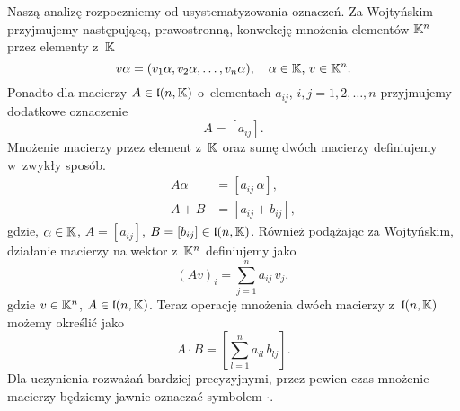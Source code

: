 \documentclass[a4paper,11pt]{article}
\begin{document}
Naszą analizę rozpoczniemy od usystematyzowania oznaczeń. Za Wojtyńskim
przyjmujemy następującą, prawostronną, konwekcję mnożenia elementów
$\mathbb{K}^{ n }$ przez elementy z~$\mathbb{K}$
\begin{equation}
  \label{eq:Wojtynski-36}
  v \alpha = ( v_{ 1 } \alpha, v_{ 2 } \alpha, \ldots, v_{ n } \alpha ), \quad
  \alpha \in \mathbb{K}, \, v \in \mathbb{K}^{ n }.
\end{equation}
Ponadto dla macierzy $A \in \mathfrak{l}( n, \mathbb{K} )$ o~elementach $a_{ ij }$,
$i, j = 1, 2, \ldots, n$ przyjmujemy dodatkowe oznaczenie
\begin{equation}
  \label{eq:Wojtynski-37}
  A = [ a_{ i j } ].
\end{equation}
Mnożenie macierzy przez element z~$\mathbb{K}$ oraz sumę dwóch macierzy
definiujemy w~zwykły sposób.
\begin{subequations}
  \begin{align}
    \label{eq:Wojtynski-38-A}
    A \alpha &= [ a_{ i j } \, \alpha ], \\
    \label{eq:Wojtynski-38-B}
    A + B &= [ a_{ i j } + b_{ i j } ],
  \end{align}
\end{subequations}
gdzie, $\alpha \in \mathbb{K}$,
$A = [ a_{ i j } ]$, $B = [ b_{ i j } ] \in \mathfrak{l}( n, \mathbb{K} )$.
Również podążając za Wojtyńskim, działanie macierzy na wektor z~$\mathbb{K}^{ n }$
definiujemy jako
\begin{equation}
  \label{eq:Wojtynski-39}
  ( A v )_{ i } = \sum_{ j = 1 }^{ n } a_{ i j } \, v_{ j },
\end{equation}
gdzie $v \in \mathbb{K}^{ n }$, $A \in \mathfrak{l}( n, \mathbb{K} )$. Teraz operację mnożenia
dwóch macierzy z~$\mathfrak{l}( n, \mathbb{K} )$ możemy określić jako
\begin{equation}
  \label{eq:Wojtynski-40}
  A \cdot B = \left[ \sum_{ l = 1 }^{ n } a_{ i l } \, b_{ l j } \right].
\end{equation}
Dla uczynienia rozważań bardziej precyzyjnymi, przez pewien czas mnożenie
macierzy będziemy jawnie oznaczać symbolem $\cdot$.
\end{document}
